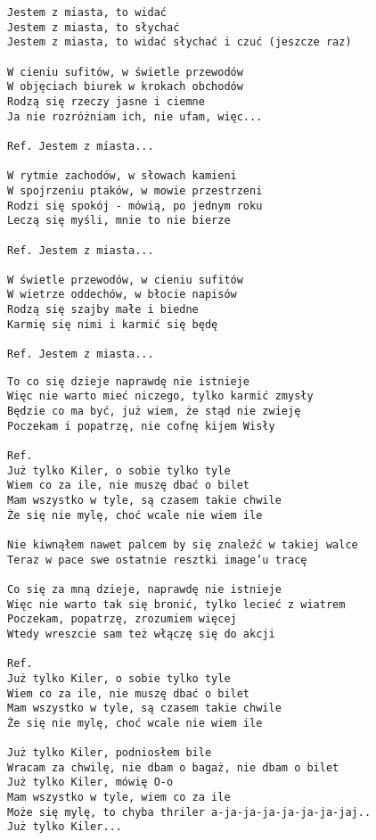 \documentclass[12pt]{article}
\begin{document}
\begin{verbatim}
Jestem z miasta, to widać
Jestem z miasta, to słychać
Jestem z miasta, to widać słychać i czuć (jeszcze raz)

W cieniu sufitów, w świetle przewodów
W objęciach biurek w krokach obchodów
Rodzą się rzeczy jasne i ciemne
Ja nie rozróżniam ich, nie ufam, więc...

Ref. Jestem z miasta...

W rytmie zachodów, w słowach kamieni
W spojrzeniu ptaków, w mowie przestrzeni
Rodzi się spokój - mówią, po jednym roku
Leczą się myśli, mnie to nie bierze

Ref. Jestem z miasta...

W świetle przewodów, w cieniu sufitów
W wietrze oddechów, w błocie napisów
Rodzą się szajby małe i biedne
Karmię się nimi i karmić się będę

Ref. Jestem z miasta...
\end{verbatim}
\clearpage

\begin{verbatim}
To co się dzieje naprawdę nie istnieje
Więc nie warto mieć niczego, tylko karmić zmysły
Będzie co ma być, już wiem, że stąd nie zwieję
Poczekam i popatrzę, nie cofnę kijem Wisły

Ref.
Już tylko Kiler, o sobie tylko tyle
Wiem co za ile, nie muszę dbać o bilet
Mam wszystko w tyle, są czasem takie chwile
Że się nie mylę, choć wcale nie wiem ile

Nie kiwnąłem nawet palcem by się znaleźć w takiej walce
Teraz w pace swe ostatnie resztki image’u tracę

Co się za mną dzieje, naprawdę nie istnieje
Więc nie warto tak się bronić, tylko lecieć z wiatrem
Poczekam, popatrzę, zrozumiem więcej
Wtedy wreszcie sam też włączę się do akcji

Ref.
Już tylko Kiler, o sobie tylko tyle
Wiem co za ile, nie muszę dbać o bilet
Mam wszystko w tyle, są czasem takie chwile
Że się nie mylę, choć wcale nie wiem ile

Już tylko Kiler, podniosłem bile
Wracam za chwilę, nie dbam o bagaż, nie dbam o bilet
Już tylko Kiler, mówię O-o
Mam wszystko w tyle, wiem co za ile
Może się mylę, to chyba thriler a-ja-ja-ja-ja-ja-ja-jaj..
Już tylko Kiler...
\end{verbatim}
\clearpage
\end{document}
